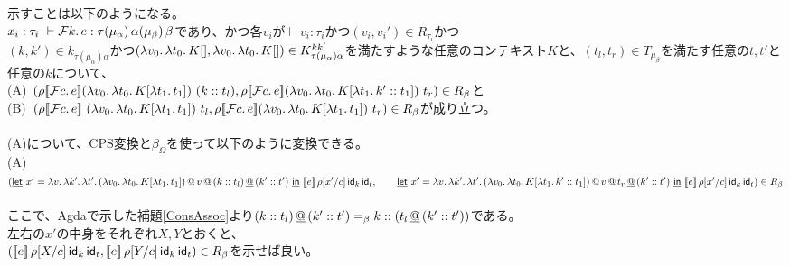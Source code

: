 示すことは以下のようになる。\\
$x_i:\tau_i\ \vdash \Control{k}{e}:\tau \TrailType{\alpha} \TrailType{\beta}$であり、かつ各$v_i$が$\vdash v_i:\tau_i$かつ$(v_i,v_i') \in R_{\tau_i}$かつ\\
$(k,k')\in k_{\tau(\mu_{\alpha})\alpha}$かつ$(\Lam{v_0}{\Lam{t_0}{K[]}}, \Lam{v_0}{\Lam{t_0}{K[]}})\in  K^{kk'}_{\tau(\mu_{\alpha})\alpha}$を満たすような任意のコンテキスト$K$と、$(t_l, t_r) \in T_{\mu_{\beta}}$を満たす任意の$t, t'$と任意の$k$について、\\
  (A)\ $(\rho \CPSTh{\Control{c}{e}} \LamP{v_0}{\Lam{t_0}{K[\Lam{t_1}{t_1}]}}\ (\Cons{k}{t_l}), \rho \CPSTh{\Control{c}{e}} \LamP{v_0}{\Lam{t_0}{K[\Lam{t_1}{\Cons{k'}{t_1}}]}}\ t_r)\in R_{\beta}$と\\
(B)\ $(\rho \CPSTh{\Control{c}{e}}\ \LamP{v_0}{\Lam{t_0}{K[\Lam{t_1}{t_1}]}}\ t_l, \rho \CPSTh{\Control{c}{e}} \LamP{v_0}{\Lam{t_0}{K[\Lam{t_1}{t_1}]}}\ t_r)\in R_{\beta}$が成り立つ。\\
\\
(A)について、CPS変換と$\beta_{\Omega}$を使って以下のように変換できる。\\
(A)\ $(\DLet{x'}
      {\Lam{v}{\Lam{k'}{\Lam{t'}
        {\App{\App{\LamP{v_0}{\Lam{t_0}{K[\Lam{t_1}{t_1}]}}}{v}}{\DAppend{\ConsP{k}{t_l}}{\ConsP{k'}{t'}}}}}}}
      {\CPS{e}{\rho[\Change{c}{x'}]}{\Idk}{\Idt}},\\
\qquad   \DLet{x'}
      {\Lam{v}{\Lam{k'}{\Lam{t'}
        {\App{\App{\LamP{v_0}{\Lam{t_0}{K[\Lam{t_1}{\Cons{k'}{t_1}}]}}}{v}}{\DAppend{t_r}{\ConsP{k'}{t'}}}}}}}
      {\CPS{e}{\rho[\Change{c}{x'}]}{\Idk}{\Idt}})
      \in R_{\beta}$\\
\\
ここで、Agdaで示した補題\ref{ConsAssoc}より$\DAppend{\ConsP{k}{t_l}}{\ConsP{k'}{t'}} =_{\beta} \Cons{k}{(\DAppend{t_l}{\ConsP{k'}{t'}}})$である。\\
      左右の$x'$の中身をそれぞれ$X,Y$とおくと、\\
      $(\CPS{e}{\rho[\Change{c}{X}]}{\Idk}{\Idt},\CPS{e}{\rho[\Change{c}{Y}]}{\Idk}{\Idt})\in R_{\beta}$を示せば良い。\\
